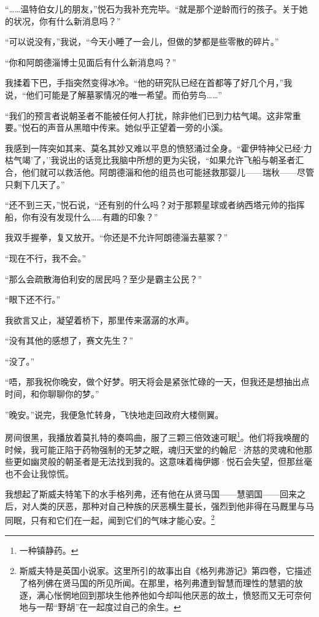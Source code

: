 \documentclass[AutoFakeBold=true]{book}
\begin{document}
``……温特伯女儿的朋友，''悦石为我补充完毕。``就是那个逆龄而行的孩子。关于她的状况，你有什么新消息吗？''

``可以说没有，''我说，``今天小睡了一会儿，但做的梦都是些零散的碎片。''

``你和阿朗德淄博士见面后有什么新消息吗？''

我揉着下巴，手指突然变得冰冷。``他的研究队已经在首都等了好几个月，''我说，``他们可能是了解墓冢情况的唯一希望。而伯劳鸟……''

``我们的预言者说朝圣者不能被任何人打扰，除非他们已到力枯气竭。这非常重要。''悦石的声音从黑暗中传来。她似乎正望着一旁的小溪。

我感到一阵突如其来、莫名其妙又难以平息的愤怒涌过全身。``霍伊特神父已经`力枯气竭'了，''我说出的话竞比我脑中所想的更为尖锐，``如果允许飞船与朝圣者汇合，他们就可以救活他。阿朗德淄和他的组员也可能拯救那婴儿——瑞秋——尽管只剩下几天了。''

``还不到三天，''悦石说，``还有别的什么吗？对于那颗星球或者纳西塔元帅的指挥船，你有没有发现什么……有趣的印象？''

我双手握拳，复又放开。``你还是不允许阿朗德淄去墓冢？''

``现在不行，我不会。''

``那么会疏散海伯利安的居民吗？至少是霸主公民？''

``眼下还不行。''

我欲言又止，凝望着桥下，那里传来潺潺的水声。

``没有其他的感想了，赛文先生？''

``没了。''

``唔，那我祝你晚安，做个好梦。明天将会是紧张忙碌的一天，但我还是想抽出点时间，和你聊聊你的梦。''

''晚安。''说完，我便急忙转身，飞快地走回政府大楼侧翼。

房间很黑，我播放着莫扎特的奏鸣曲，服了三颗三倍效速可眠\footnote{一种镇静药。}。他们将我唤醒的时候，我可能正陷于药物强制的无梦之眠，魂归天堂的约翰尼·济慈的灵魂和他那些更如幽灵般的朝圣者是无法找到我的。这意味着梅伊娜·悦石会失望，但那丝毫也不会让我惊慌。

我想起了斯威夫特笔下的水手格列弗，还有他在从贤马国——慧驷国——回来之后，对人类的厌恶，那种对自己种族的厌恶横生蔓长，强烈到他非得在马厩里与马同眠，只有和它们在一起，闻到它们的气味才能心安。\footnote{斯威夫特是英国小说家。这里所引的故事出自《格列弗游记》第四卷，它描述了格列佛在贤马国的所见所闻。在那里，格列弗遭到智慧而理性的慧驷的放逐，满心怅惘地回到那块生他养他如今却叫他厌恶的故土，愤怒而又无可奈何地与一帮``野胡''在一起度过自己的余生。}
\end{document}
